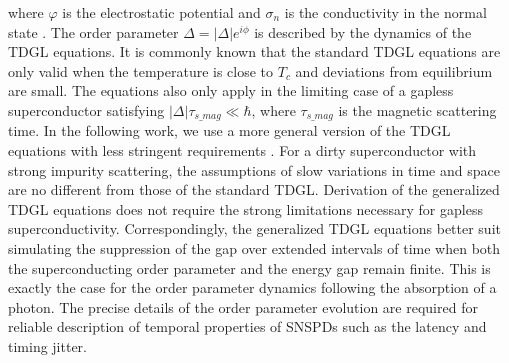 \documentclass[%
reprint,
 amsmath,amssymb,
aps,
pra,
]{revtex4-1}
\begin{document}
where \(\varphi\) is the electrostatic potential and \(\sigma_n\) is the conductivity in the normal state \cite{vodolazov_single-photon_2017}.  The order parameter \(\Delta = \left|\Delta\right|e^{i \phi} \) is described by the dynamics of the TDGL equations.  It is commonly known that the standard TDGL equations are only valid when the temperature is close to \(T_c\) and deviations from equilibrium are small.  The equations also only apply in the limiting case of a gapless superconductor satisfying \(\left|\Delta\right| \tau_{s\_mag} \ll \hbar \), where \(\tau_{s\_mag}\) is the magnetic scattering time.  In the following work, we use a more general version of the TDGL equations with less stringent requirements \cite{watts-tobin_nonequilibrium_1981,kopnin_theory_2001}.  For a dirty superconductor with strong impurity scattering, the assumptions of slow variations in time and space are no different from those of the standard TDGL.  Derivation of the generalized TDGL equations does not require the strong limitations necessary for gapless superconductivity.  Correspondingly, the generalized TDGL equations better suit simulating the suppression of the gap over extended intervals of time when both the superconducting order parameter and the energy gap remain finite.  This is exactly the case for the order parameter dynamics following the absorption of a photon.  The precise details of the order parameter evolution are required for reliable description of temporal properties of SNSPDs such as the latency and timing jitter.  
\end{document}
